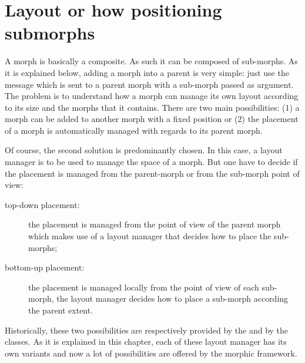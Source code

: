\documentclass[a4paper,10pt,twoside]{book}
\begin{document}
\section{Layout or how positioning submorphs}



A morph is basically a composite. As such it can be composed of sub-morphs. As it is explained below, adding a morph into a parent is very simple: just use the  message which is sent to a parent morph with a sub-morph passed as argument. The problem is to understand how a morph can manage its own layout according to its size and the morphs that it contains. There are two main possibilities: (1) a morph can be added to another morph with a fixed position or (2) the placement of a morph is automatically managed with regards to its parent morph.

Of course, the second solution is predominantly chosen. In this case, a layout manager is to be used to manage the space of a morph. But one have to decide if the placement is managed from the parent-morph or from the sub-morph point of view:
\begin{description}
\item[top-down placement:] the placement is managed from the point of view of the parent morph which makes use of a layout manager that decides how to place the sub-morphs;
\item[bottom-up placement:] the placement is managed locally from the point of view of each sub-morph, the layout manager decides how to place a sub-morph according the parent extent.
\end{description}
Historically, these two possibilities are respectively provided by the  and by the  classes. As it is explained in this chapter, each of these layout manager has its own variants and now a lot of possibilities are offered by the morphic framework.

\end{document}
